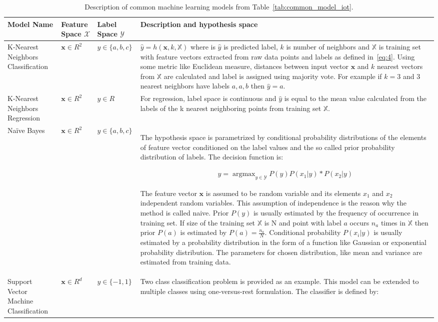 \documentclass[english, 12pt, a4paper, elec, utf8, online]{aaltothesis}
\DeclareMathOperator*{\argmax}{argmax} %
\begin{document}
\begin{longtable}{ |p{3cm}|p{1.5cm}|p{2.2cm}|p{9cm}| } 
\caption{Description of common machine learning models from Table~\ref{tab:common_model_iot}.} \label{tab:common_model_iot_desc}\\
\hline
\textbf{Model Name} & \textbf{Feature Space} $\mathcal{X}$ & \textbf{Label Space} $\mathcal{Y}$  & \textbf{Description and hypothesis space} \\
\hline
K-Nearest Neighbors \newline Classification 
& $\mathbf{x} \in R^2$ 
& $y \in \{a, b, c\}$ 
& $\hat{y} = h(\mathbf{x}, k, \mathbb{X})$ where is $\hat{y}$ is predicted label, $k$ is number of neighbors and $\mathbb{X}$ is training set with feature vectors extracted from raw data points and labels as defined in~\ref{eq:4}. Using some metric like Euclidean measure, distances between input vector $\mathbf{x}$ and $k$ nearest vectors from $\mathbb{X}$ are calculated and label is assigned using majority vote. For example if $k=3$ and 3 nearest neighbors have labels $a,a,b$ then $\hat{y}=a$.      
\\ 
\hline 
K-Nearest Neighbors \newline Regression 
& $\mathbf{x} \in R^2$ 
& $y \in R$ 
& For regression, label space is continuous and $\hat{y}$ is equal to the mean value calculated from the labels of the k nearest neighboring points from training set $\mathbb{X}$. 
\\
\hline
Naïve Bayes 
& $\mathbf{x} \in R^2$  
& $y \in \{a, b, c\}$ 
& The hypothesis space is parametrized by conditional probability distributions of the elements of feature vector conditioned on the label values and the so called prior probability distribution of labels. The decision function is:

\begin{align*}
\hat{y} = \argmax_{y \in \mathcal{Y}} P(y)P(x_1|y)*P(x_2|y) 
\end{align*}  

The feature vector $\mathbf{x}$ is assumed to be random variable and its elements $x_{1}$ and $x_{2}$ independent random variables. This assumption of independence is the reason why the method is called naive. Prior $P(y)$ is usually estimated by the frequency of occurrence in training set. If size of the training set $\mathbb{X}$ is N and point with label $a$ occurs $n_a$ times in $\mathbb{X}$ then prior $P(a)$ is estimated by $P(a)=\frac{n_a}{N}$. Conditional probability $P(x_i|y)$ is usually estimated by  a probability distribution in the form of a function like Gaussian or exponential probability distribution. The parameters for chosen distribution, like mean and variance are estimated from training data.      
\\ 
\hline 
Support Vector Machine \newline Classification 
& $\mathbf{x} \in R^d$  
& $y \in \{-1, 1\}$
& Two class classification problem is provided as an example. This model can be extended to multiple classes using one-versus-rest formulation. The classifier is defined by:


\end{longtable}
\end{document}
